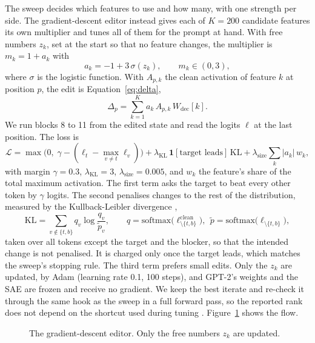 The sweep decides which features to use and how many, with one strength per side. The gradient-descent editor instead gives each of $K=200$ candidate features its own multiplier and tunes all of them for the prompt at hand. With free numbers $z_k$, set at the start so that no feature changes, the multiplier is $m_k=1+a_k$ with
\begin{equation}\label{eq:a}
a_k=-1+3\,\sigma(z_k),\qquad m_k\in(0,3),
\end{equation}
where $\sigma$ is the logistic function. With $A_{p,k}$ the clean activation of feature $k$ at position $p$, the edit is Equation~\ref{eq:delta},
\begin{equation}\label{eq:gdedit}
\Delta_p=\sum_{k=1}^{K}a_k\,A_{p,k}\,W_{\mathrm{dec}}[k].
\end{equation}
We run blocks 8 to 11 from the edited state and read the logits $\ell$ at the last position. The loss is
\begin{equation}\label{eq:loss}
\mathcal{L}=\max\!\bigl(0,\;\gamma-(\ell_t-\max_{v\ne t}\ell_v)\bigr)+\lambda_{\mathrm{KL}}\,\mathbf{1}[\text{target leads}]\,\mathrm{KL}+\lambda_{\mathrm{size}}\sum_k|a_k|\,w_k ,
\end{equation}
with margin $\gamma=0.3$, $\lambda_{\mathrm{KL}}=3$, $\lambda_{\mathrm{size}}=0.005$, and $w_k$ the feature's share of the total maximum activation. The first term asks the target to beat every other token by $\gamma$ logits. The second penalises changes to the rest of the distribution, measured by the Kullback-Leibler divergence \cite{r54},
\begin{equation}\label{eq:kl}
\mathrm{KL}=\sum_{v\notin\{t,b\}}q_v\log\frac{q_v}{\tilde p_v},\qquad q=\mathrm{softmax}\bigl(\ell^{\mathrm{clean}}_{\setminus\{t,b\}}\bigr),\ \ \tilde p=\mathrm{softmax}\bigl(\ell_{\setminus\{t,b\}}\bigr),
\end{equation}
taken over all tokens except the target and the blocker, so that the intended change is not penalised. It is charged only once the target leads, which matches the sweep's stopping rule. The third term prefers small edits. Only the $z_k$ are updated, by Adam \cite{r36} (learning rate 0.1, 100 steps), and GPT-2's weights and the SAE are frozen and receive no gradient. We keep the best iterate and re-check it through the same hook as the sweep in a full forward pass, so the reported rank does not depend on the shortcut used during tuning \cite{p13}. Figure~\ref{fig:gdflow} shows the flow.

\begin{figure}[!htb]
\centering
{}
\caption{The gradient-descent editor. Only the free numbers $z_k$ are updated.}\label{fig:gdflow}
\end{figure}

